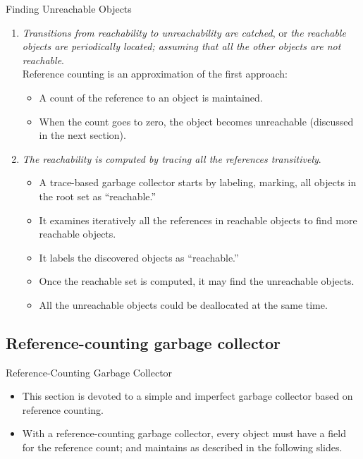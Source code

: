 \begin{bibunit}[apalike]
\begin{frame}[allowframebreaks]{Finding Unreachable Objects}
	\begin{enumerate}
	\item \emph{Transitions from reachability to unreachability are catched}, or \emph{the reachable objects are periodically located; assuming that all the other objects are not reachable}. \\[1em]
		Reference counting is an approximation of the first approach:
		\begin{itemize}
		\item A count of the reference to an object is maintained.
		\item When the count goes to zero, the object becomes unreachable (discussed in the next section).
		\end{itemize}
	\framebreak
	\item \emph{The reachability is computed by tracing all the references transitively}. \\[1em]
		\begin{itemize}
		\item A trace-based garbage collector starts by labeling, marking, all objects in the root set as ``reachable.''
		\item It examines iteratively all the references in reachable objects to find more reachable objects.
		\item It labels the discovered objects as ``reachable.''
		\item Once the reachable set is computed, it may find the unreachable objects.
		\item All the unreachable objects could be deallocated at the same time.
		\end{itemize}
	\end{enumerate}
\end{frame}

\subsection{Reference-counting garbage collector}

\tableofcontentslide[sections={2-6},sectionstyle={show/shaded},subsectionstyle={show/shaded/hide},subsubsectionstyle={show/show/hide/hide}]

\begin{frame}{Reference-Counting Garbage Collector}
	\begin{itemize}
	\item This section is devoted to a simple and imperfect garbage collector based on reference counting.
	\vspace{2em}
	\item With a reference-counting garbage collector, every object must have a field for the reference count; and maintains as described in the following slides.
	\end{itemize}
\end{frame}


\end{bibunit}
